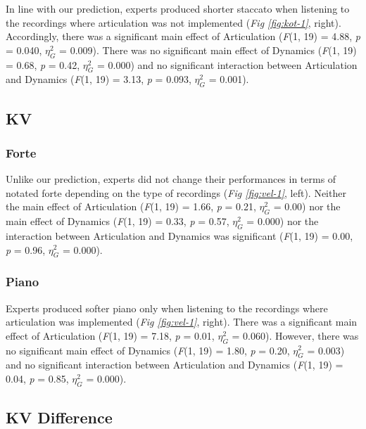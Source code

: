 \documentclass[
  man,floatsintext]{apa6}
\begin{document}
In line with our prediction, experts produced shorter staccato when listening to the recordings where articulation was not implemented (\emph{Fig \ref{fig:kot-1}}, right). Accordingly, there was a significant main effect of Articulation (\emph{F}(1, 19) = 4.88, \emph{p} = 0.040, \(\eta_G^2\) = 0.009). There was no significant main effect of Dynamics (\emph{F}(1, 19) = 0.68, \emph{p} = 0.42, \(\eta_G^2\) = 0.000) and no significant interaction between Articulation and Dynamics (\emph{F}(1, 19) = 3.13, \emph{p} = 0.093, \(\eta_G^2\) = 0.001).

\hypertarget{kv}{%
\subsection{KV}\label{kv}}

\hypertarget{forte}{%
\subsubsection{Forte}\label{forte}}

Unlike our prediction, experts did not change their performances in terms of notated forte depending on the type of recordings (\emph{Fig \ref{fig:vel-1}}, left). Neither the main effect of Articulation (\emph{F}(1, 19) = 1.66, \emph{p} = 0.21, \(\eta_G^2\) = 0.00) nor the main effect of Dynamics (\emph{F}(1, 19) = 0.33, \emph{p} = 0.57, \(\eta_G^2\) = 0.000) nor the interaction between Articulation and Dynamics was significant (\emph{F}(1, 19) = 0.00, \emph{p} = 0.96, \(\eta_G^2\) = 0.000).

\hypertarget{piano}{%
\subsubsection{Piano}\label{piano}}

Experts produced softer piano only when listening to the recordings where articulation was implemented (\emph{Fig \ref{fig:vel-1}}, right). There was a significant main effect of Articulation (\emph{F}(1, 19) = 7.18, \emph{p} = 0.01, \(\eta_G^2\) = 0.060). However, there was no significant main effect of Dynamics (\emph{F}(1, 19) = 1.80, \emph{p} = 0.20, \(\eta_G^2\) = 0.003) and no significant interaction between Articulation and Dynamics (\emph{F}(1, 19) = 0.04, \emph{p} = 0.85, \(\eta_G^2\) = 0.000).

\hypertarget{kv-difference}{%
\subsection{KV Difference}\label{kv-difference}}
\end{document}
